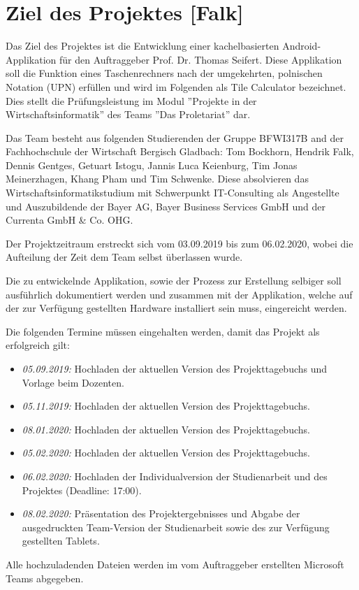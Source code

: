 \section{Ziel des Projektes [Falk]}

Das Ziel des Projektes ist die Entwicklung einer kachelbasierten Android-Applikation für den Auftraggeber Prof. Dr. Thomas Seifert. Diese Applikation soll die Funktion eines Taschenrechners nach der umgekehrten, polnischen Notation (UPN) erfüllen und wird im Folgenden als Tile Calculator bezeichnet. Dies stellt die Prüfungsleistung im Modul ''Projekte in der Wirtschaftsinformatik'' des Teams ''Das Proletariat'' dar. 

Das Team besteht aus folgenden Studierenden der Gruppe BFWI317B and der Fachhochschule der Wirtschaft Bergisch Gladbach: Tom Bockhorn, Hendrik Falk, Dennis Gentges, Getuart Istogu, Jannis Luca Keienburg, Tim Jonas Meinerzhagen, Khang Pham und Tim Schwenke. Diese absolvieren das Wirtschaftsinformatikstudium mit Schwerpunkt IT-Consulting als Angestellte und Auszubildende der Bayer AG, Bayer Business Services GmbH und der Currenta GmbH \& Co. OHG.

Der Projektzeitraum erstreckt sich vom 03.09.2019 bis zum 06.02.2020, wobei die Aufteilung der Zeit dem Team selbst überlassen wurde.

Die zu entwickelnde Applikation, sowie der Prozess zur Erstellung selbiger soll ausführlich dokumentiert werden und zusammen mit der Applikation, welche auf der zur Verfügung gestellten Hardware installiert sein muss, eingereicht werden. 

Die folgenden Termine müssen eingehalten werden, damit das Projekt als erfolgreich gilt: 

\begin{itemize}
	\item \textit{05.09.2019:} Hochladen der aktuellen Version des Projekttagebuchs und Vorlage beim Dozenten.
	\item \textit{05.11.2019:} Hochladen der aktuellen Version des Projekttagebuchs.
	\item \textit{08.01.2020:} Hochladen der aktuellen Version des Projekttagebuchs.
	\item \textit{05.02.2020:} Hochladen der aktuellen Version des Projekttagebuchs.
	\item \textit{06.02.2020:} Hochladen der Individualversion der Studienarbeit und des Projektes (Deadline: 17:00).
	\item \textit{08.02.2020:} Präsentation des Projektergebnisses und Abgabe der ausgedruckten Team-Version der Studienarbeit sowie des zur Verfügung gestellten Tablets.
\end{itemize}

Alle hochzuladenden Dateien werden im vom Auftraggeber erstellten Microsoft Teams abgegeben.